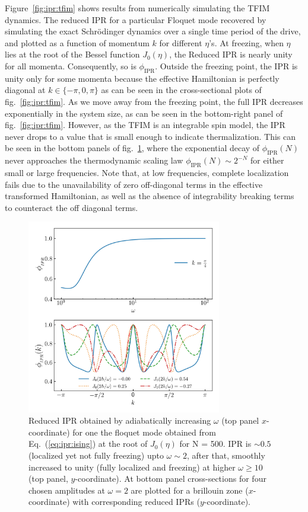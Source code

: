 \documentclass[%
reprint,
superscriptaddress,
amsmath,amssymb,
aps,
prb,
showkeys,
]{revtex4-2}
\begin{document}
Figure~\ref{fig:ipr:tfim} shows results from numerically simulating the TFIM dynamics. The reduced IPR for a particular Floquet mode recovered by simulating the exact Schr\"odinger dynamics over a single time period of the drive, and plotted as a function of momentum $k$ for different $\eta$'s. At freezing, when $\eta$ lies at the root of the Bessel function $J_0(\eta)$,  the {Reduced} IPR is {nearly} unity for all momenta. Consequently, so is $\phi_\mathrm{IPR}$.  Outside the freezing point, the IPR is unity only for some momenta because the effective Hamiltonian is perfectly diagonal at $k \in{\{-\pi, 0, \pi\}}$ as can be seen in the cross-sectional plots of fig.~\ref{fig:ipr:tfim}. As we move away from the freezing point, the full IPR decreases exponentially in the system size, as can be seen in the bottom-right panel of fig.~\ref{fig:ipr:tfim}.
However, as the TFIM is an integrable spin model, the IPR never drops to a value that is small enough to indicate thermalization. This can be seen in the bottom panels of fig.~\ref{fig:ipr:isinglowfrk}, where the exponential decay of $\phi_\mathrm{IPR}(N)$ never approaches the thermodynamic scaling law $\phi_\mathrm{IPR}(N)\sim 2^{-N}$ for either small or large frequencies. Note that, at low frequencies, {complete localization} fails due to the unavailability of zero off-diagonal terms in the  effective transformed Hamiltonian, as well as the absence of integrability breaking terms to counteract the off diagonal terms. 
\begin{figure}[t!]
	\centering
	\includegraphics[width = 8.5cm]{figure_3.jpeg}
	\caption{Reduced IPR obtained by adiabatically increasing $\omega$ (top panel $x$-coordinate) for one the floquet mode obtained from Eq.~(\ref{eq:ipr:ising}) at the root of $J_0(\eta)$ for N = 500. IPR is $\sim 0.5$ (localized yet not fully freezing) upto $\omega \sim 2$, after that, smoothly increased to unity (fully localized and freezing) at higher $\omega \geq 10$ (top panel, $y$-coordinate). At bottom panel cross-sections for four chosen amplitudes at $\omega =2$ are plotted for a brillouin zone ($x$-coordinate) with corresponding reduced IPRs ($y$-coordinate).}
	\label{fig:ipr:isinglowfrk}
\end{figure}
\end{document}
